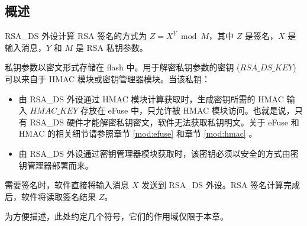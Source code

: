 \documentclass[main\_\_CN.tex]{subfiles}
\begin{document}
\subsection{概述}

RSA\_DS 外设计算 RSA 签名的方式为 \begin{math}Z = X^{Y} \bmod M\end{math}，其中 \begin{math}Z\end{math} 是签名，\begin{math}X\end{math} 是输入消息，\begin{math}Y\end{math} 和 \begin{math}M\end{math} 是 RSA 私钥参数。

私钥参数以密文形式存储在 flash 中。用于解密私钥参数的密钥 (\begin{math} RSA\_DS\_KEY \end{math}) 可以来自于 HMAC 模块或密钥管理器模块。当该私钥：
\begin{itemize}
    \item 由 RSA\_DS 外设通过 HMAC 模块计算获取时，生成密钥所需的 HMAC 输入 \begin{math} HMAC\_KEY \end{math} 存放在 eFuse 中，只允许被 HMAC 模块访问。也就是说，只有 RSA\_DS 硬件才能解密私钥密文，软件无法获取私钥明文。关于 eFuse 和 HMAC 的相关细节请参照章节 \ref{mod:efuse} \textit{} 和章节 \ref{mod:hmac} \textit{}。
    \item 由 RSA\_DS 外设通过密钥管理器模块获取时，该密钥必须以安全的方式由密钥管理器部署而来。
\end{itemize}
需要签名时，软件直接将输入消息 \begin{math}X\end{math} 发送到 RSA\_DS 外设。RSA 签名计算完成后，软件将读取签名结果 \begin{math}Z\end{math}。

为方便描述，此处约定几个符号，它们的作用域仅限于本章。
\end{document}
